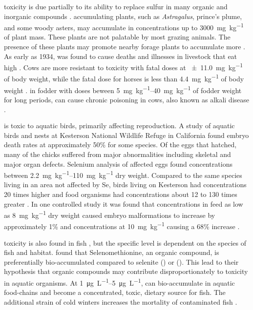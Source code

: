 \Se toxicity is due partially to its ability to replace sulfur in many organic and inorganic compounds \parencite{Besser1989}.  \Se accumulating plants, such as \textit{Astragalus}, prince's plume, and some woody asters, may accumulate \Se in concentrations up to \SI{3000}{\milli\g\per\kilo\g} of plant mass.  These plants are not palatable by most grazing animals.  The presence of these plants may promote nearby forage plants to accumulate more \Se \parencite{2006USDA}.  As early as 1934, \Se was found to cause deaths and illnesses in livestock that eat high \Se \parencite{scott1973,Rohwer1931,Besser1989,2006USDA}.  Cows are more resistant to \Se toxicity with fatal doses at \SI{\pm11.0}{\milli\g\per\kilo\g} of body weight, while the fatal dose for horses is less than \SI{4.4}{\milli\g\per\kilo\g} of body weight \parencite{Painter1940}.  \Se in fodder with doses beween \SIrange{5}{40}{\milli\g\per\kilo\g} of fodder weight for long periods, can cause chronic poisoning in cows, also known as alkali disease \parencite{2006USDA}.

\Se is toxic to aquatic birds, primarily affecting reproduction.  A study of aquatic birds and nests at Kesterson National Wildlife Refuge in California found embryo death rates at approximately 50\% for some species.  Of the eggs that hatched, many of the chicks suffered from major abnormalities including skeletal and major organ defects.  Selenium analysis of affected eggs found concentrations between \SIrange{2.2}{110}{\milli\g\per\kilo\g} dry weight.  Compared to the same species living in an area not affected by Se, birds living on Kesterson had \Se concentrations 20 times higher and food organisms had \Se concentrations about 12 to 130 times greater \parencite{Ohlendorf1986}.  In one controlled study it was found that \Se concentrations in feed as low as \SI{8}{\milli\g\per\kilo\g} dry weight caused embryo malformations to increase by approximately 1\% and concentrations at  \SI{10}{\milli\g\per\kilo\g} causing a 68\% increase \parencite{2002Spallholz}.

\Se toxicity is also found in fish \parencite{gillespie1986,Lemly1988}, but the specific level is dependent on the species of fish and habitat.  \textcite{Besser1989} found that Selenomethionine, an organic \Se compound, is preferentially bio-accumulated compared to selenite (\selenite) or  (\selenate).  This lead to their hypothesis that organic \Se compounds may contribute disproportionately to toxicity in aquatic organisms.  At \SIrange{1}{5}{\micro\g\per\liter}, \Se can bio-accumulate in aquatic food-chains and become a concentrated, toxic, dietary source for fish.  The additional strain of cold winters increases the mortality of \Se contaminated fish \parencite{Lemly1993}.  

